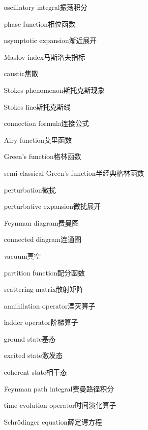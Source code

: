 \begin{multicols}{2}
oscillatory integral\hspace{0.9em}振荡积分\par
phase function\hspace{0.9em}相位函数\par
asymptotic expansion\hspace{0.9em}渐近展开\par
Maslov index\hspace{0.9em}马斯洛夫指标\par
caustic\hspace{0.9em}焦散\par
Stokes phenomenon\hspace{0.9em}斯托克斯现象\par
Stokes line\hspace{0.9em}斯托克斯线\par
connection formula\hspace{0.9em}连接公式\par
Airy function\hspace{0.9em}艾里函数\par
Green's function\hspace{0.9em}格林函数\par
semi-classical Green's function\hspace{0.9em}半经典格林函数\par
perturbation\hspace{0.9em}微扰\par
perturbative expansion\hspace{0.9em}微扰展开\par
Feynman diagram\hspace{0.9em}费曼图\par
connected diagram\hspace{0.9em}连通图\par
vacuum\hspace{0.9em}真空\par
partition function\hspace{0.9em}配分函数\par
scattering matrix\hspace{0.9em}散射矩阵\par
annihilation operator\hspace{0.9em}湮灭算子\par
ladder operator\hspace{0.9em}阶梯算子\par
ground state\hspace{0.9em}基态\par
excited state\hspace{0.9em}激发态\par
coherent state\hspace{0.9em}相干态\par
Feynman path integral\hspace{0.9em}费曼路径积分\par
time evolution operator\hspace{0.9em}时间演化算子\par
Schrödinger equation\hspace{0.9em}薛定谔方程\par
\end{multicols}

